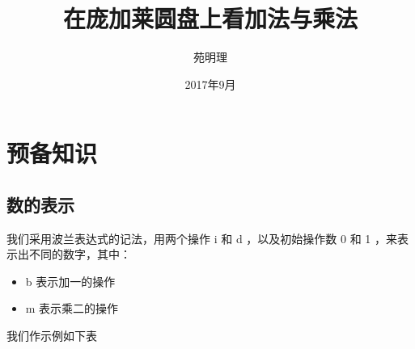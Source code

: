 \documentclass[a4paper,12pt]{article}
\title{在庞加莱圆盘上看加法与乘法}
\author{苑明理}
\date{2017年9月}
\begin{document}
\maketitle{}

\renewcommand\contentsname{目录}
\setcounter{tocdepth}{2}
\tableofcontents

\newpage

\section{预备知识}

\subsection{数的表示}

我们采用波兰表达式的记法，用两个操作 i 和 d ，以及初始操作数 0 和 1 ，来表示出不同的数字，其中：

\begin{itemize}
\item b 表示加一的操作
\item m 表示乘二的操作
\end{itemize}

我们作示例如下表
\end{document}
